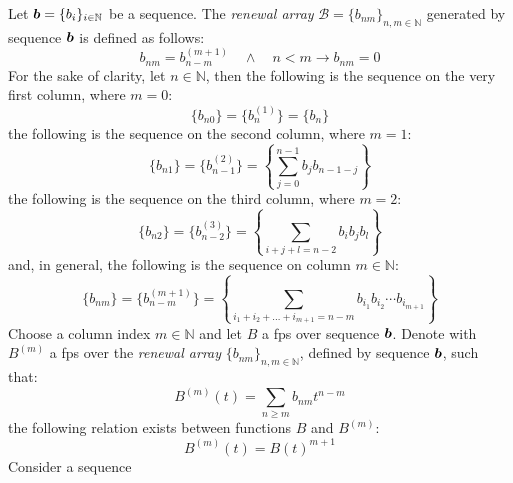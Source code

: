 Let $\boldsymbol{b}=\lbrace b_{i}\rbrace_{i\in\mathbb{N}}$ be a sequence. 
The \emph{renewal array} 
$\mathcal{B}=\lbrace b_{nm}\rbrace_{n,m\in\mathbb{N}}$
generated by sequence $\boldsymbol{b}$ is defined as follows:
\begin{displaymath}
    b_{nm}=b_{n-m}^{(m+1)} \quad\wedge\quad n < m\rightarrow b_{nm}=0
\end{displaymath}
For the sake of clarity, let $n\in\mathbb{N}$, then
the following is the sequence on the very first column, where $m=0$:
\begin{displaymath}
    \lbrace b_{n0}\rbrace
        =\lbrace b_{n}^{(1)}\rbrace
        =\lbrace b_{n}\rbrace
\end{displaymath}
the following is the sequence on the second column, where $m=1$:
\begin{displaymath}
    \lbrace b_{n1}\rbrace
        =\lbrace b_{n-1}^{(2)}\rbrace
        =\left\lbrace \sum_{j=0}^{n-1}{b_{j}b_{n-1-j}}\right\rbrace
\end{displaymath}
the following is the sequence on the third column, where $m=2$:
\begin{displaymath}
    \lbrace b_{n2}\rbrace
        =\lbrace b_{n-2}^{(3)}\rbrace
        =\left\lbrace \sum_{i+j+l=n-2}{b_{i}b_{j}b_{l}}\right\rbrace
\end{displaymath}
and, in general, the following is the sequence on column $m\in\mathbb{N}$:
\begin{displaymath}
    \lbrace b_{nm}\rbrace
        =\lbrace b_{n-m}^{(m+1)}\rbrace
        =\left\lbrace \sum_{i_{1}+i_{2}+\ldots+i_{m+1} =n-m}
            {b_{i_{1}}b_{i_{2}}\cdots b_{i_{m+1}}}\right\rbrace
\end{displaymath}
Choose a column index $m\in\mathbb{N}$ and let $B$ a \ac{fps} over sequence $\boldsymbol{b}$.
Denote with $B^{(m)}$ a \ac{fps} over the \emph{renewal array} 
$\lbrace b_{nm} \rbrace_{n,m\in\mathbb{N}}$, defined by sequence $\boldsymbol{b}$, 
such that:
\begin{displaymath}
    B^{(m)}(t) = \sum_{n\geq m}{b_{nm}t^{n-m}}
\end{displaymath}
the following relation exists between functions $B$ and $B^{(m)}$:
\begin{displaymath}
    B^{(m)}(t) = B(t)^{m+1}
\end{displaymath}
Consider a sequence
